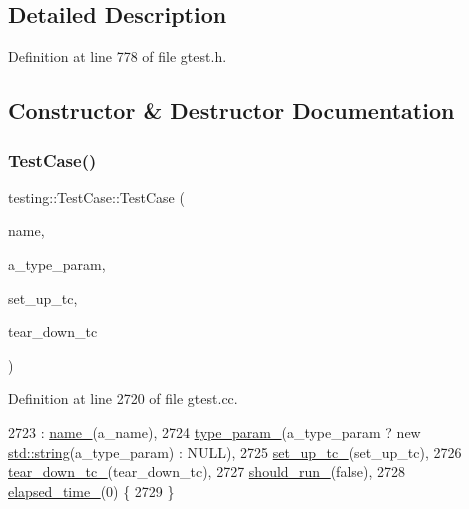 \subsection{Detailed Description}


Definition at line 778 of file gtest.\+h.



\subsection{Constructor \& Destructor Documentation}
\mbox{\label{classtesting_1_1TestCase_a8a43b04703bfc7d56597fcb9b76ffbf5}} 
\subsubsection{\texorpdfstring{Test\+Case()}{TestCase()}}
{\footnotesize\ttfamily testing\+::\+Test\+Case\+::\+Test\+Case (\begin{DoxyParamCaption}\item[{const char $\ast$}]{name,  }\item[{const char $\ast$}]{a\+\_\+type\+\_\+param,  }\item[{\hyperlink{classtesting_1_1Test_a5f2a051d1d99c9b784c666c586186cf9}{Test\+::\+Set\+Up\+Test\+Case\+Func}}]{set\+\_\+up\+\_\+tc,  }\item[{\hyperlink{classtesting_1_1Test_aa0f532e93b9f3500144c53f31466976c}{Test\+::\+Tear\+Down\+Test\+Case\+Func}}]{tear\+\_\+down\+\_\+tc }\end{DoxyParamCaption})}



Definition at line 2720 of file gtest.\+cc.


\begin{DoxyCode}
2723     : \hyperlink{classtesting_1_1TestCase_a6c16e28e7555dc6a158415b3bfc4f833}{name\_}(a\_name),
2724       \hyperlink{classtesting_1_1TestCase_a4952403fca9baa20275b3fcdc28977db}{type\_param\_}(a\_type\_param ? \textcolor{keyword}{new} \hyperlink{namespacetesting_1_1internal_a8e8ff5b11e64078831112677156cb111}{std::string}(a\_type\_param) : NULL),
2725       \hyperlink{classtesting_1_1TestCase_a272e1bcea07b9654ffc5470e64579d35}{set\_up\_tc\_}(set\_up\_tc),
2726       \hyperlink{classtesting_1_1TestCase_a0ceb56d10b167cfc51a286a7b9b2fbbc}{tear\_down\_tc\_}(tear\_down\_tc),
2727       \hyperlink{classtesting_1_1TestCase_a2f98fefe1f624c879e0320882c561d85}{should\_run\_}(\textcolor{keyword}{false}),
2728       \hyperlink{classtesting_1_1TestCase_a0379c376d8832e6fd1d5d9c7c3c32759}{elapsed\_time\_}(0) \{
2729 \}
\end{DoxyCode}
\mbox{\label{classtesting_1_1TestCase_a96ab68dd1f8f64a7087ac34ff64a2e46}} 
